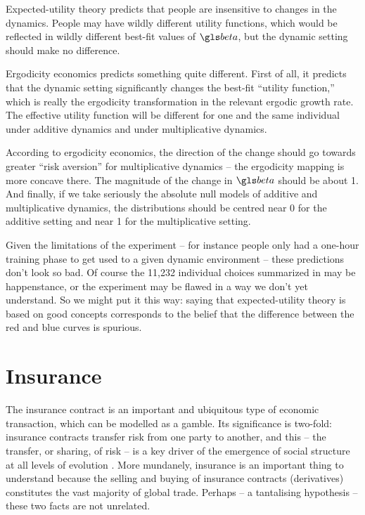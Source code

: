 Expected-utility theory predicts that people are insensitive to changes in the dynamics. 
People may have wildly different utility functions, which would be reflected in wildly 
different best-fit values of $\gbeta$, but the dynamic setting should make no difference. 

Ergodicity economics predicts something quite different. First of all, it predicts that the 
dynamic setting significantly changes the best-fit ``utility function,'' which is really the 
ergodicity transformation in the relevant ergodic growth rate. The effective utility function will 
be different for one and the same individual under additive dynamics and under 
multiplicative dynamics. 

According to ergodicity economics, the direction of the change should go towards 
greater ``risk aversion'' for multiplicative dynamics -- the ergodicity mapping is more 
concave there. The magnitude of the change in $\gbeta$ should be about 1. And finally, 
if we take seriously the absolute null models of additive and multiplicative dynamics, 
the distributions should be centred near 0 for the additive setting and near 1 for the 
multiplicative setting. 

Given the limitations of the experiment -- for instance people only had a one-hour 
training phase to get used to a given dynamic environment -- these predictions don't look 
so bad. Of course the 11,232 individual choices summarized in  
may be happenstance, or the experiment may be flawed in a way we don't yet 
understand. So we might put it this way: saying that expected-utility theory is 
based on good concepts corresponds to the belief that the difference between 
the red and blue curves is spurious.

\section{Insurance}
The insurance contract is an important and ubiquitous type of economic transaction, 
which can be modelled as a gamble. Its significance is two-fold: insurance contracts 
transfer risk from one party to another, and this -- the transfer, or sharing, of risk -- is 
a key driver of the emergence of social structure at all levels of evolution 
. More mundanely, insurance is an important thing
to understand because the selling and buying of insurance contracts (derivatives)
constitutes the vast majority of global trade. Perhaps -- a tantalising hypothesis -- 
these two facts are not unrelated.

